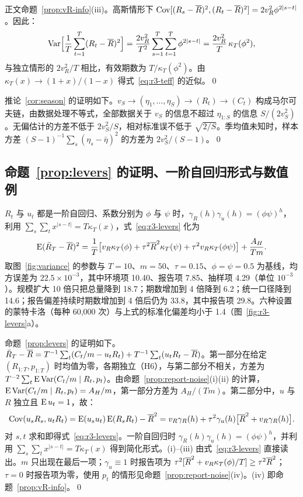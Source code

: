 正文命题~\ref{prop:vR-info}(iii)。高斯情形下 $\operatorname{Cov}[(R_s-\overline{R})^2,(R_t-\overline{R})^2]=2v_R^2\phi^{2|s-t|}$。因此：
\begin{equation}
  \operatorname{Var}\Bigl[\frac1T\sum_{t=1}^T(R_t-\overline{R})^2\Bigr]=\frac{2v_R^2}{T^2}\sum_{s=1}^{T}\sum_{t=1}^{T}\phi^{2|s-t|}=\frac{2v_R^2}{T}\,\kappa_T(\phi^2),
\end{equation}
与独立情形的 $2v_R^2/T$ 相比，有效期数为 $T/\kappa_T(\phi^2)$。由 $\kappa_T(x)\to(1+x)/(1-x)$ 得式~\eqref{eq:r3-teff} 的近似。\qed

推论~\ref{cor:season} 的证明如下。$v_S\to(\eta_1,\dots,\eta_S)\to(R_t)\to(C_t)$ 构成马尔可夫链，由数据处理不等式，全部数据关于 $v_S$ 的信息不超过 $\eta_{1:S}$ 的信息 $S/(2v_S^2)$。无偏估计的方差不低于 $2v_S^2/S$，相对标准误不低于 $\sqrt{2/S}$。季均值未知时，样本方差 $(S-1)^{-1}\sum_s(\eta_s-\bar\eta)^2$ 的方差为 $2v_S^2/(S-1)$。\qed

\subsection{\texorpdfstring{命题~\ref{prop:levers} 的证明、一阶自回归形式与数值例}{命题 6 的证明、一阶自回归形式与数值例}}
\label{app:levers-num}\label{sec:s-levers}

$R_t$ 与 $u_t$ 都是一阶自回归、系数分别为 $\phi$ 与 $\psi$ 时，$\gamma_R(h)\gamma_u(h)=(\phi\psi)^h$，利用 $\sum_s\sum_tx^{|s-t|}=T\kappa_T(x)$，式~\eqref{eq:r3-levers} 化为
\begin{equation}
  \operatorname{E}(\bar R_T-\overline{R})^2=\frac1T\bigl[v_R\kappa_T(\phi)+\tau^2\overline{R}^2\kappa_T(\psi)+\tau^2v_R\kappa_T(\phi\psi)\bigr]+\frac{A_H}{Tm}.
\end{equation}
取图~\ref{fig:variance} 的参数与 $T=10$、$m=50$、$\tau=0.15$、$\phi=\psi=0.5$ 为基线，均方误差为 $22.5\times10^{-3}$，其中环境项 10.40、报告项 7.85、抽样项 4.29（单位 $10^{-3}$）。规模扩大 10 倍只把总量降到 18.7；期数增加到 4 倍降到 6.2；统一口径降到 14.6；报告偏差持续时期数增加到 4 倍后仍为 33.8，其中报告项 29.8。六种设置的蒙特卡洛（每种 60,000 次）与上式的标准化偏差均小于 1.4（图~\ref{fig:r3-levers}a）。

命题~\ref{prop:levers} 的证明如下。$\bar R_T-\overline{R}=T^{-1}\sum_t(C_t/m-u_tR_t)+T^{-1}\sum_t(u_tR_t-\overline{R})$。第一部分在给定 $(R_{1:T},p_{1:T})$ 时均值为零，各期独立（H6），与第二部分不相关，方差为 $T^{-2}\sum_t\operatorname{E}\operatorname{Var}(C_t/m\mid R_t,p_t)$。由命题~\ref{prop:report-noise}(i)(ii) 的计算，$\operatorname{E}\operatorname{Var}(C_t/m\mid R_t,p_t)=A_H/m$，第一部分方差为 $A_H/(Tm)$。第二部分中，$u$ 与 $R$ 独立且 $\operatorname{E} u_t=1$，故：
\begin{equation}
  \operatorname{Cov}(u_sR_s,u_tR_t)=\operatorname{E}(u_su_t)\operatorname{E}(R_sR_t)-\overline{R}^2=v_R\gamma_R(h)+\tau^2\gamma_u(h)\bigl[\overline{R}^2+v_R\gamma_R(h)\bigr].
\end{equation}
对 $s,t$ 求和即得式~\eqref{eq:r3-levers}。一阶自回归时 $\gamma_R(h)\gamma_u(h)=(\phi\psi)^h$，并利用 $\sum_s\sum_tx^{|s-t|}=T\kappa_T(x)$ 得到简化形式。(i)--(iii) 由式~\eqref{eq:r3-levers} 直接读出。$m$ 只出现在最后一项；$\gamma_u\equiv1$ 时报告项为 $\tau^2[\overline{R}^2+v_R\kappa_T(\phi)/T]\geq\tau^2\overline{R}^2$；$\tau=0$ 时报告项为零，使用 $p_t$ 的情形见命题~\ref{prop:report-noise}(iv)。(iv) 即命题~\ref{prop:vR-info}。\qed

